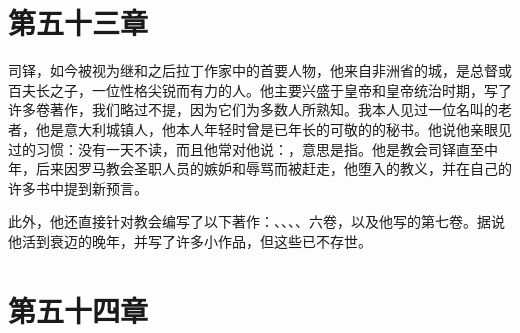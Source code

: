 
\section{第五十三章}

司铎，如今被视为继和之后拉丁作家中的首要人物，他来自非洲省的城，是总督或百夫长之子，一位性格尖锐而有力的人。他主要兴盛于皇帝和皇帝统治时期，写了许多卷著作，我们略过不提，因为它们为多数人所熟知。我本人见过一位名叫的老者，他是意大利城镇人，他本人年轻时曾是已年长的可敬的的秘书。他说他亲眼见过的习惯：没有一天不读，而且他常对他说：，意思是指。他是教会司铎直至中年，后来因罗马教会圣职人员的嫉妒和辱骂而被赶走，他堕入的教义，并在自己的许多书中提到新预言。\par

此外，他还直接针对教会编写了以下著作：、、、、六卷，以及他写的第七卷。据说他活到衰迈的晚年，并写了许多小作品，但这些已不存世。\par


\section{第五十四章}

